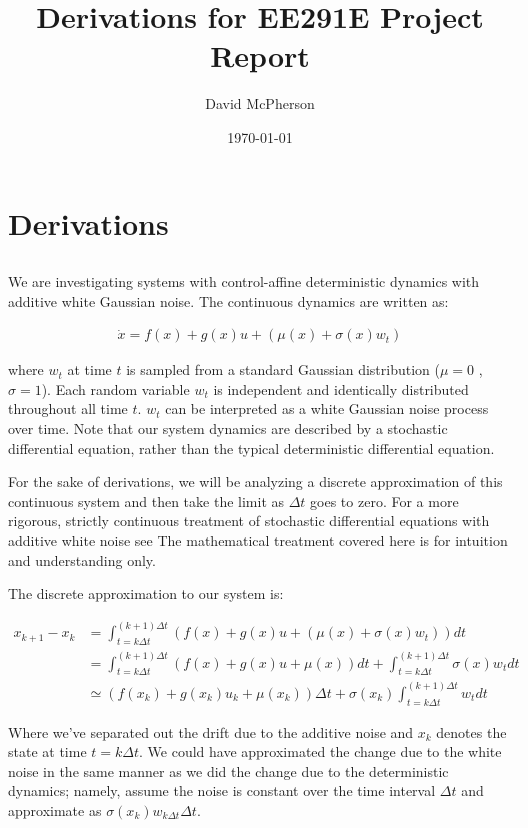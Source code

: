\documentclass[a4paper]{article}
\title{Derivations for EE291E Project Report}
\author{David McPherson}
\date{\today}
\begin{document}
\section{Derivations}
\subsection{}
We are investigating systems with control-affine deterministic dynamics with additive white Gaussian noise.
The continuous dynamics are written as:

\begin{align*}
\dot{x} = f(x) + g(x) u + (\mu(x) + \sigma(x) w_t)
\end{align*}

where $w_t$ at time $t$ is sampled from a standard Gaussian distribution ($\mu = 0$ , $\sigma = 1$).
Each random variable $w_t$ is independent and identically distributed throughout all time $t$.
$w_t$ can be interpreted as a white Gaussian noise process over time.
Note that our system dynamics are described by a stochastic differential equation, rather than the typical deterministic differential equation.

For the sake of derivations, we will be analyzing a discrete approximation of this continuous system and then take the limit as $\Delta t$ goes to zero.
For a more rigorous, strictly continuous treatment of stochastic differential equations with additive white noise see %
The mathematical treatment covered here is for intuition and understanding only.

The discrete approximation to our system is:

\begin{align*}
x_{k+1} - x_k &= \int_{t = k \Delta t}^{(k+1) \Delta t} (f(x) + g(x) u + (\mu(x) + \sigma(x) w_t) )dt
  \\  &= \int_{t = k \Delta t}^{(k+1) \Delta t} (f(x) + g(x) u + \mu(x)) dt + \int_{t = k \Delta t}^{(k+1) \Delta t} \sigma(x) w_t dt
\\ &\simeq (f(x_k) + g(x_k) u_k + \mu(x_k)) \Delta t + \sigma(x_k) \int_{t = k \Delta t}^{(k+1) \Delta t} w_t dt
\end{align*}

Where we've separated out the drift due to the additive noise and $x_k$ denotes the state at time $t = k \Delta t$.
We could have approximated the change due to the white noise in the same manner as we did the change due to the deterministic dynamics;
namely, assume the noise is constant over the time interval $\Delta t$ and approximate as $\sigma(x_k) w_{k \Delta t} \Delta t$.
\end{document}
